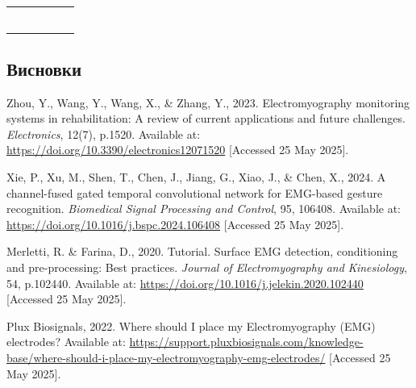 \begin{Table}
\begin{tabularx}{\linewidth}{|l|c|c|c|c|X|}
	\hline   &   &  &  &  &  \\
	\rule{0pt}{10pt}   &   &	 &	  & &	 \\ 
	\hline 
	\rule{0pt}{10pt}  &  &   &	  &	  &  \\ 
	\hline 
	\rule{0pt}{10pt}  &   &	 &	  &	  &	 \\ 
	\hline 
	\rule{0pt}{10pt}  &   &   &	  &	  & \\ 
	\hline 
	\rule{0pt}{10pt}   &	  &  &   &	  &  \\ 
	\hline 
\end{tabularx} \label{radap1725tab2}
\end{Table}
\begin{multicols}{2}




\section*{Висновки}


\renewcommand{\refname}{References}

\begin{thebibliography}{99}\footnotesize 

Zhou, Y., Wang, Y., Wang, X., \& Zhang, Y., 2023. Electromyography monitoring systems in rehabilitation: A review of current applications and future challenges. \textit{Electronics}, 12(7), p.1520. Available at: \url{https://doi.org/10.3390/electronics12071520} [Accessed 25 May 2025].

Xie, P., Xu, M., Shen, T., Chen, J., Jiang, G., Xiao, J., \& Chen, X., 2024. A channel-fused gated temporal convolutional network for EMG-based gesture recognition. \textit{Biomedical Signal Processing and Control}, 95, 106408. Available at: \url{https://doi.org/10.1016/j.bspc.2024.106408} [Accessed 25 May 2025].

Merletti, R. \& Farina, D., 2020. Tutorial. Surface EMG detection, conditioning and pre-processing: Best practices. \textit{Journal of Electromyography and Kinesiology}, 54, p.102440. Available at: \url{https://doi.org/10.1016/j.jelekin.2020.102440} [Accessed 25 May 2025].

Plux Biosignals, 2022. Where should I place my Electromyography (EMG) electrodes? Available at: \url{https://support.pluxbiosignals.com/knowledge-base/where-should-i-place-my-electromyography-emg-electrodes/} [Accessed 25 May 2025].


\end{thebibliography}
\end{multicols}
